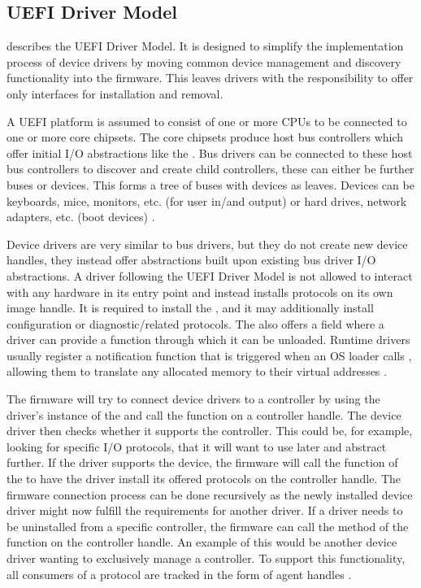 \subsection{\acs{UEFI} Driver Model}

\cite[Section 2.5]{uefi-spec} describes the \acs{UEFI} Driver Model.
It is designed to simplify the implementation process of device drivers by moving common device management and discovery functionality into the firmware.
This leaves drivers with the responsibility to offer only interfaces for installation and removal.

A \ac{UEFI} platform is assumed to consist of one or more \acsp{CPU} to be connected to one or more core chipsets.
The core chipsets produce host bus controllers which offer initial \ac{I/O} abstractions like the .
Bus drivers can be connected to these host bus controllers to discover and create child controllers, these can either be further buses or devices.
This forms a tree of buses with devices as leaves.
Devices can be keyboards, mice, monitors, etc. (for user in\-/and output) or hard drives, network adapters, etc. (boot devices) \cite[Section 2.5]{uefi-spec}.

Device drivers are very similar to bus drivers, but they do not create new device handles, they instead offer abstractions built upon existing bus driver \ac{I/O} abstractions.
A driver following the \ac{UEFI} Driver Model is not allowed to interact with any hardware in its entry point and instead installs protocols on its own image handle.
It is required to install the , and it may additionally install configuration or diagnostic\-/related protocols.
The  also offers a field where a driver can provide a function through which it can be unloaded.
Runtime drivers usually register a notification function that is triggered when an \ac{OS} loader calls , allowing them to translate any allocated memory to their virtual addresses \cite[Section 2.5.2]{uefi-spec}.

The firmware will try to connect device drivers to a controller by using the driver's instance of the  and call the  function on a controller handle.
The device driver then checks whether it supports the controller.
This could be, for example, looking for specific \ac{I/O} protocols, that it will want to use later and abstract further.
If the driver supports the device, the firmware will call the  function of the  to have the driver install its offered protocols on the controller handle.
The firmware connection process can be done recursively as the newly installed device driver might now fulfill the requirements for another driver.
If a driver needs to be uninstalled from a specific controller, the firmware can call the  method of the  function on the controller handle.
An example of this would be another device driver wanting to exclusively manage a controller.
To support this functionality, all consumers of a protocol are tracked in the form of agent handles \cite[Section 2.5.4]{uefi-spec}.

